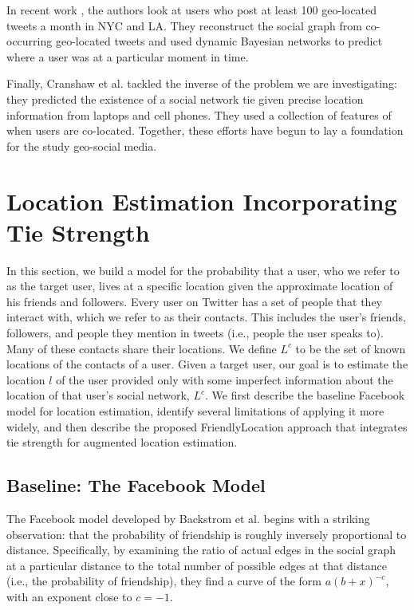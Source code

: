 \documentclass{sig-alternate}
\begin{document}
In recent work \cite{sadilek2012finding}, the authors look at users who post at
least 100 geo-located tweets a month in NYC and LA.
%
They reconstruct the social graph from co-occurring geo-located tweets and used
dynamic Bayesian networks to predict where a user was at a particular moment in
time.

Finally, Cranshaw et al. \cite{cranshaw2010bridging} tackled the inverse of the
problem we are investigating: they predicted the existence of a social network
tie given precise location information from laptops and cell phones.
%
They used a collection of features of when users are co-located.
%
Together, these efforts have begun to lay a foundation for the study geo-social media.

\section{Location Estimation Incorporating Tie Strength}
In this section, we build a model for the probability that a user, who we refer
to as the target user, lives at a specific location given the approximate
location of his friends and followers.
%
Every user on Twitter has a set of people that they interact with, which we
refer to as their contacts.
%
This includes the user's friends, followers, and people they mention in tweets
(i.e., people the user speaks to).
%
Many of these contacts share their locations.
%
We define $L^c$ to be the set of known locations of the contacts of a user.
%
Given a target user, our goal is to estimate the location $l$ of the user
provided only with some imperfect information about the location of that user's
social network, $L^c$.
%
We first describe the baseline Facebook model for location estimation, identify
several limitations of applying it more widely, and then describe the proposed
FriendlyLocation approach that integrates tie strength for augmented location
estimation.

\subsection{Baseline: The Facebook Model}
The Facebook model developed by Backstrom et al. \cite{backstrom2010find}
begins with a striking observation: that the probability of friendship is
roughly inversely proportional to distance.
%
Specifically, by examining the ratio of actual edges in the social graph at a
particular distance to the total number of possible edges at that distance
(i.e., the probability of friendship), they find a curve of the form
$a(b+x)^{-c}$, with an exponent close to $c=-1$.
\end{document}
